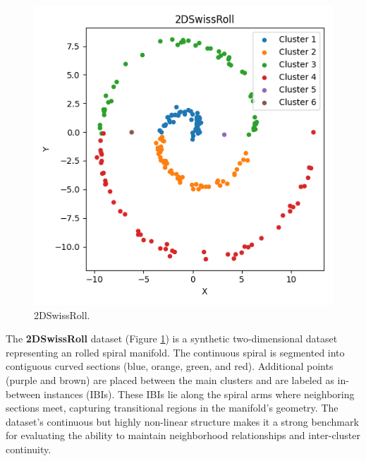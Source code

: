 \begin{figure}
    \centering
    \includegraphics[width=\myimgwidth]{images/datasets/2DSwissRoll.png}
    \caption{2DSwissRoll.}
    \label{fig:2DSwissRoll}
\end{figure}
The \textbf{2DSwissRoll} dataset (Figure \ref{fig:2DSwissRoll}) is a synthetic two-dimensional dataset representing an rolled spiral manifold. The continuous spiral is segmented into contiguous curved sections (blue, orange, green, and red). Additional points (purple and brown) are placed between the main clusters and are labeled as in-between instances (IBIs). These IBIs lie along the spiral arms where neighboring sections meet, capturing transitional regions in the manifold’s geometry. The dataset’s continuous but highly non-linear structure makes it a strong benchmark for evaluating the ability to maintain neighborhood relationships and inter-cluster continuity.
\newline

